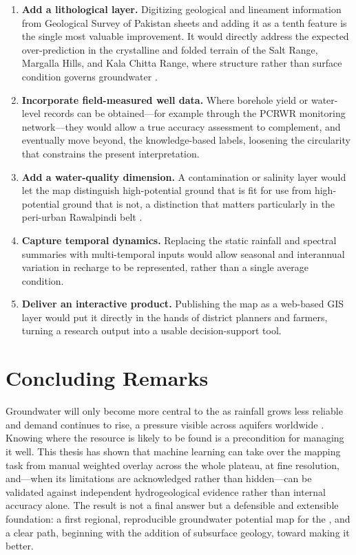 \begin{enumerate}
  \item \textbf{Add a lithological layer.} Digitizing geological and lineament
        information from Geological Survey of Pakistan sheets and adding it as a
        tenth feature is the single most valuable improvement. It would directly
        address the expected over-prediction in the crystalline and folded terrain
        of the Salt Range, Margalla Hills, and Kala Chitta Range, where structure
        rather than surface condition governs groundwater \cite{benjmel2020morocco}.

  \item \textbf{Incorporate field-measured well data.} Where borehole yield or
        water-level records can be obtained---for example through the PCRWR
        monitoring network---they would allow a true accuracy assessment to
        complement, and eventually move beyond, the knowledge-based labels,
        loosening the circularity that constrains the present interpretation.

  \item \textbf{Add a water-quality dimension.} A contamination or salinity layer
        would let the map distinguish high-potential ground that is fit for use
        from high-potential ground that is not, a distinction that matters
        particularly in the peri-urban Rawalpindi belt \cite{waseem2024waterquality}.

  \item \textbf{Capture temporal dynamics.} Replacing the static rainfall and
        spectral summaries with multi-temporal inputs would allow seasonal and
        interannual variation in recharge to be represented, rather than a single
        average condition.

  \item \textbf{Deliver an interactive product.} Publishing the map as a web-based
        GIS layer would put it directly in the hands of district planners and
        farmers, turning a research output into a usable decision-support tool.
\end{enumerate}

\section{Concluding Remarks}
\label{sec:concl_remarks}

Groundwater will only become more central to the \studyarea{} as rainfall grows
less reliable and demand continues to rise, a pressure visible across aquifers
worldwide \cite{jasechko2024gwdecline}. Knowing where the resource is likely to be
found is a precondition for managing it well. This thesis has shown that machine
learning can take over the mapping task from manual weighted overlay across the
whole plateau, at fine resolution, and---when its limitations are acknowledged
rather than hidden---can be validated against independent hydrogeological evidence
rather than internal accuracy alone. The result is not a final answer but a
defensible and extensible foundation: a first regional, reproducible groundwater
potential map for the \studyarea{}, and a clear path, beginning with the addition
of subsurface geology, toward making it better.
